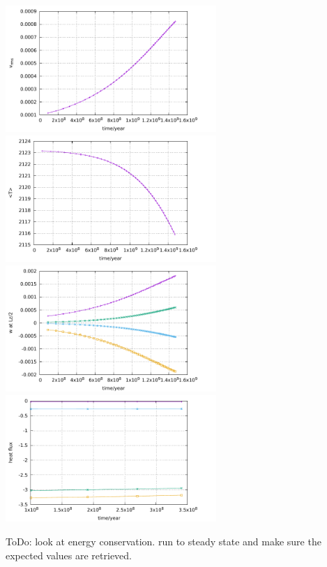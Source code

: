 \begin{center}
\includegraphics[width=8cm]{python_codes/fieldstone_busse/results/vrms.pdf}
\includegraphics[width=8cm]{python_codes/fieldstone_busse/results/Tavrg.pdf}\\
\includegraphics[width=8cm]{python_codes/fieldstone_busse/results/wmid.pdf}
\includegraphics[width=8cm]{python_codes/fieldstone_busse/results/hf.pdf}
\end{center}



{\color{red} ToDo}: look at energy conservation. run to steady state and make sure the expected values are retrieved.

